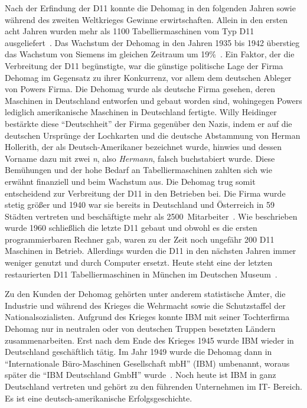 \documentclass[parskip=half]{scrartcl}
\begin{document}
Nach der Erfindung der D11 konnte die Dehomag in den folgenden Jahren sowie
während des zweiten Weltkrieges Gewinne erwirtschaften. Allein in den ersten
acht Jahren wurden mehr als 1100 Tabelliermaschinen vom Typ D11
ausgeliefert~\cite{Kist95}. Das Wachstum der Dehomag in den Jahren 1935 bis 1942 
überstieg das Wachstum von Siemens im gleichen Zeitraum um
19\%~\cite{heide2009punched}. Ein Faktor, der die Verbreitung der D11 begünstigte, war die günstige politische
Lage der Firma Dehomag im Gegensatz zu ihrer Konkurrenz, vor allem dem
deutschen Ableger von Powers Firma. Die Dehomag wurde als deutsche Firma
gesehen, deren Maschinen in Deutschland entworfen und gebaut worden sind,
wohingegen Powers lediglich amerikanische Maschinen in Deutschland fertigte.
Willy Heidinger bestärkte diese \enquote{Deutschheit} der
Firma gegenüber den Nazis, indem er auf die deutschen Ursprünge der Lochkarten
und die deutsche Abstammung von Herman Hollerith, der als Deutsch-Amerikaner
bezeichnet wurde, hinwies und dessen Vorname dazu mit zwei \emph{n}, also
\emph{Hermann}, falsch buchstabiert wurde. Diese Bemühungen und der hohe
Bedarf an Tabelliermaschinen zahlten sich wie erwähnt finanziell und beim Wachstum aus. Die Dehomag trug somit entscheidend zur Verbreitung der
D11 in den Betrieben bei. Die Firma wurde stetig größer und 1940 war sie
bereits in Deutschland und Österreich in 59 Städten vertreten und beschäftigte
mehr als 2500~Mitarbeiter~\cite{dingwerth}. Wie beschrieben wurde 1960 schließlich die
letzte D11 gebaut und obwohl es die ersten programmierbaren Rechner gab, waren
zu der Zeit noch ungefähr 200 D11 Maschinen in Betrieb. Allerdings wurden die
D11 in den nächsten Jahren immer weniger genutzt und durch Computer ersetzt.
Heute steht eine der letzten restaurierten D11 Tabelliermaschinen in München im
Deutschen Museum~\cite{Kist95}.

Zu den Kunden der Dehomag gehörten unter anderem statistische Ämter, die
Industrie und während des Krieges die Wehrmacht sowie die Schutzstaffel der
Nationalsozialisten. Aufgrund des Krieges konnte IBM mit seiner Tochterfirma
Dehomag nur in neutralen oder von deutschen Truppen besetzten Ländern
zusammenarbeiten. Erst nach dem Ende des Krieges 1945 wurde IBM wieder in
Deutschland geschäftlich tätig. Im Jahr 1949 wurde die Dehomag dann in
\enquote{Internationale Büro-Maschinen Gesellschaft mbH} (IBM) umbenannt,
woraus später die \enquote{IBM Deutschland GmbH} wurde~\cite{sendler}.
Noch heute ist IBM in ganz Deutschland vertreten und gehört zu den führenden
Unternehmen im IT- Bereich. Es ist eine deutsch-amerikanische
Erfolgsgeschichte.
\end{document}
